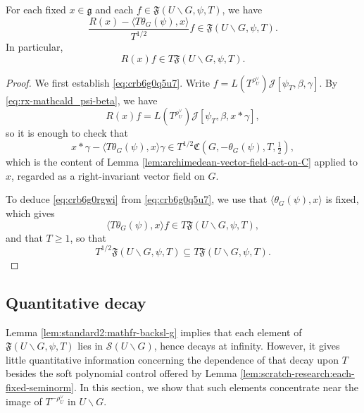 \begin{lemma}\label{lem:standard:each-fixed-x-1}
  For each fixed $x \in \mathfrak{g}$ and each $f \in \mathfrak{F}(U \backslash G, \psi, T)$, we have
  \begin{equation}\label{eq:crb6g0q5u7}
    \frac{R(x) - \langle T \theta_G(\psi)  , x  \rangle }{T^{1/2}} f \in \mathfrak{F}(U \backslash G, \psi, T).
  \end{equation}
  In particular,
  \begin{equation}\label{eq:crb6g0rgwi}
    R(x) f \in T \mathfrak{F}(U \backslash G, \psi, T).
  \end{equation}
\end{lemma}
\begin{proof}
  We first establish \eqref{eq:crb6g0q5u7}.  Write $f = L(T^{\rho_U^\vee}) \mathcal{J}[\psi_T,\beta,\gamma]$.  By \eqref{eq:rx-mathcald_psi-beta}, we have
  \begin{equation*}
    R(x) f = L(T^{\rho_U^\vee}) \mathcal{J}[\psi_T,\beta,x \ast \gamma],
  \end{equation*}
  so it is enough to check that
  \begin{equation*}
    x \ast \gamma -  \langle T \theta_G(\psi), x \rangle \gamma
    \in T^{1/2} \mathfrak{C}(G,-\theta_G(\psi),T,\tfrac{1}{2}),
  \end{equation*}
  which is the content of Lemma \ref{lem:archimedean-vector-field-act-on-C} applied to $x$, regarded as a right-invariant vector field on $G$.

  To deduce \eqref{eq:crb6g0rgwi} from \eqref{eq:crb6g0q5u7}, we use that $\langle \theta_G(\psi), x \rangle$ is fixed, which gives
  \begin{equation*}
    \langle T \theta_G(\psi), x \rangle f \in T \mathfrak{F}(U \backslash G, \psi, T),
  \end{equation*}
  and that $T \geq 1$, so that
  \begin{equation*}
    T^{1/2} \mathfrak{F}(U \backslash G, \psi, T) \subseteq T \mathfrak{F}(U \backslash G, \psi, T).
  \end{equation*}
\end{proof}

\subsection{Quantitative decay}\label{sec:cnjgzs9fmn}
Lemma \ref{lem:standard2:mathfr-backsl-g} implies that each element of $\mathfrak{F}(U \backslash G, \psi, T)$ lies in $\mathcal{S}(U \backslash G)$, hence decays at infinity.  However, it gives little quantitative information concerning the dependence of that decay upon $T$ besides the soft polynomial control offered by Lemma \ref{lem:scratch-research:each-fixed-seminorm}.  In this section, we show that such elements concentrate near the image of $T^{-\rho_U^\vee}$ in $U \backslash G$.


